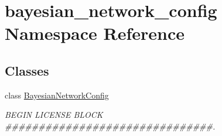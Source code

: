 \hypertarget{namespacebayesian__network__config}{}\section{bayesian\+\_\+network\+\_\+config Namespace Reference}
\label{namespacebayesian__network__config}
\subsection*{Classes}
\begin{DoxyCompactItemize}
\item 
class \hyperlink{classbayesian__network__config_1_1_bayesian_network_config}{Bayesian\+Network\+Config}
\begin{DoxyCompactList}\small\item\em B\+E\+G\+IN L\+I\+C\+E\+N\+SE B\+L\+O\+CK \#\#\#\#\#\#\#\#\#\#\#\#\#\#\#\#\#\#\#\#\#\#\#\#\#\#\#\#\#\#\#. \end{DoxyCompactList}\end{DoxyCompactItemize}
